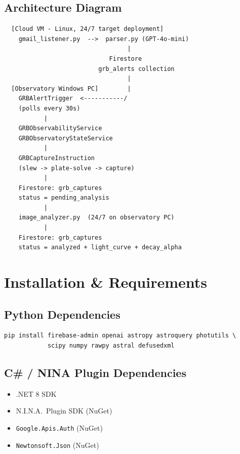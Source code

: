 \documentclass[12pt,a4paper]{article}
\begin{document}
\subsection{Architecture Diagram}

\begin{verbatim}
  [Cloud VM - Linux, 24/7 target deployment]
    gmail_listener.py  -->  parser.py (GPT-4o-mini)
                                  |
                             Firestore
                          grb_alerts collection
                                  |
  [Observatory Windows PC]        |
    GRBAlertTrigger  <-----------/
    (polls every 30s)
           |
    GRBObservabilityService
    GRBObservatoryStateService
           |
    GRBCaptureInstruction
    (slew -> plate-solve -> capture)
           |
    Firestore: grb_captures
    status = pending_analysis
           |
    image_analyzer.py  (24/7 on observatory PC)
           |
    Firestore: grb_captures
    status = analyzed + light_curve + decay_alpha
\end{verbatim}

\section{Installation \& Requirements}

\subsection{Python Dependencies}

\begin{lstlisting}[style=bash, caption={Install Python dependencies}]
pip install firebase-admin openai astropy astroquery photutils \
            scipy numpy rawpy astral defusedxml
\end{lstlisting}

\subsection{C\# / NINA Plugin Dependencies}

\begin{itemize}
    \item .NET 8 SDK
    \item N.I.N.A.\ Plugin SDK (NuGet)
    \item \texttt{Google.Apis.Auth} (NuGet)
    \item \texttt{Newtonsoft.Json} (NuGet)
\end{itemize}
\end{document}
